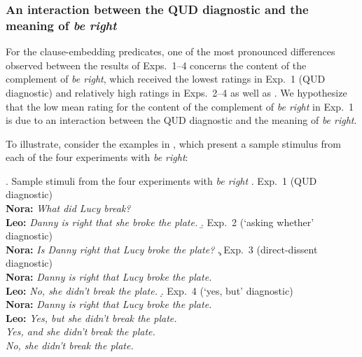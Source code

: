 \documentclass[times,linguex]{glossa}
\begin{document}
\subsubsection{An interaction between the QUD diagnostic and the meaning of \emph{be right} \label{ssub:be-right}}

For the clause-embedding predicates, one of the most pronounced differences observed between the results of Exps.~1--4 concerns the content of the complement of \emph{be right}, which received the lowest ratings in Exp.~1 (QUD diagnostic) and relatively high ratings in Exps.~2--4 as well as \citealt{degen_projection_2025}. %
We hypothesize that the low mean rating for the content of the complement of \emph{be right} in Exp.~1 is due to an interaction between the QUD diagnostic and the meaning of \emph{be right}.


To illustrate, consider the examples in \Next, which present a sample stimulus from each of the four experiments with \emph{be right}:

\ex. Sample stimuli from the four experiments with \emph{be right}
\a.\label{beright.a}  Exp.~1 (QUD diagnostic) 
\\ {\bf Nora:} \emph{What did Lucy break?}
\\ {\bf Leo:} \emph{Danny is right that she broke the plate.} \smallskip
\b.\label{beright.b} Exp.~2 (`asking whether' diagnostic)
\\ {\bf Nora:} \emph{Is Danny right that Lucy broke the plate?} \smallskip
\c.\label{beright.c} Exp.~3 (direct-dissent diagnostic)
\\ {\bf Nora:} \emph{Danny is right that Lucy broke the plate.}
\\ {\bf Leo:} \emph{No, she didn't break the plate.} \smallskip
\d.\label{beright.d} Exp.~4 (`yes, but' diagnostic)
\\ {\bf Nora:} \emph{Danny is right that Lucy broke the plate.}  
\\ {\bf Leo:} \emph{Yes, but she didn't break the plate.}
\\ \hspace*{1cm} \emph{Yes, and she didn't break the plate.}
\\ \hspace*{1cm} \emph{No, she didn't break the plate.}
\end{document}
